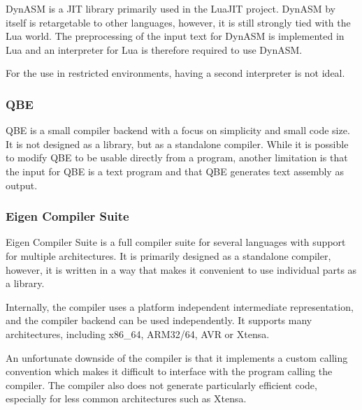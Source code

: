 DynASM is a JIT library primarily used in the LuaJIT project\cite{dynasm}. DynASM by itself is retargetable to other languages, however, it is still strongly tied with the Lua world. The preprocessing of the input text for DynASM is implemented in Lua and an interpreter for Lua is therefore required to use DynASM.

For the use in restricted environments, having a second interpreter is not ideal.


\subsubsection{QBE}

QBE is a small compiler backend with a focus on simplicity and small code size\cite{qbe}. It is not designed as a library, but as a standalone compiler. While it is possible to modify QBE to be usable directly from a program, another limitation is that the input for QBE is a text program and that QBE generates text assembly as output.


\subsubsection{Eigen Compiler Suite}

Eigen Compiler Suite is a full compiler suite for several languages with support for multiple architectures\cite{ecs}. It is primarily designed as a standalone compiler, however, it is written in a way that makes it convenient to use individual parts as a library.

Internally, the compiler uses a platform independent intermediate representation, and the compiler backend can be used independently. It supports many architectures, including x86\_64, ARM32/64, AVR or Xtensa.

An unfortunate downside of the compiler is that it implements a custom calling convention which makes it difficult to interface with the program calling the compiler. The compiler also does not generate particularly efficient code, especially for less common architectures such as Xtensa.
